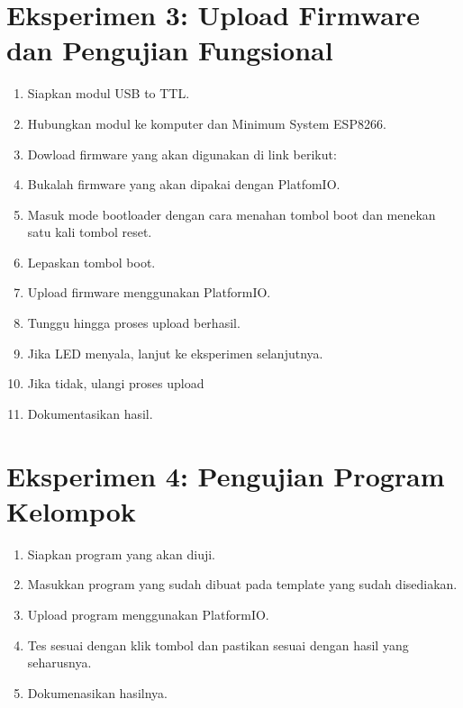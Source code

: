 \section{Eksperimen 3: Upload Firmware dan Pengujian Fungsional}
\begin{enumerate}
    \item Siapkan modul USB to TTL.
    \item Hubungkan modul ke komputer dan Minimum System ESP8266.
    \item Dowload firmware yang akan digunakan di link berikut: \url{}
    \item Bukalah firmware yang akan dipakai dengan PlatfomIO.
    \item Masuk mode bootloader dengan cara menahan tombol boot dan menekan satu kali tombol reset.
    \item Lepaskan tombol boot.
    \item Upload firmware menggunakan PlatformIO.
    \item Tunggu hingga proses upload berhasil.
    \item Jika LED menyala, lanjut ke eksperimen selanjutnya.
    \item Jika tidak, ulangi proses upload
    \item Dokumentasikan hasil.
\end{enumerate}

\section{Eksperimen 4: Pengujian Program Kelompok}
\begin{enumerate}
    \item Siapkan program yang akan diuji.
    \item Masukkan program yang sudah dibuat pada template yang sudah disediakan.
    \item Upload program menggunakan PlatformIO.
    \item Tes sesuai dengan klik tombol dan pastikan sesuai dengan hasil yang seharusnya.
    \item Dokumenasikan hasilnya.
\end{enumerate}

